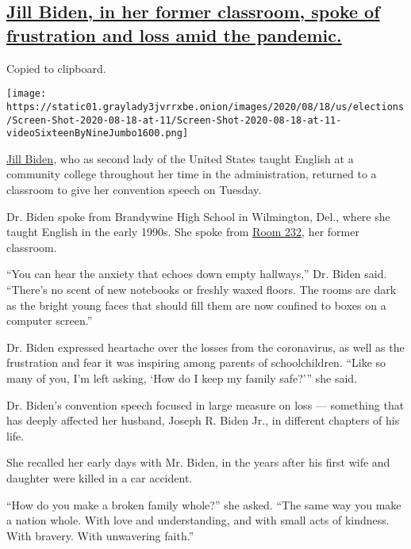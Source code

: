 \hypertarget{jill-biden-in-her-former-classroom-spoke-of-frustration-and-loss-amid-the-pandemic}{%
\subsection{\texorpdfstring{\protect\hyperlink{jill-biden-returns-to-her-old-classroom-to-deliver-convention-speech}{Jill
Biden, in her former classroom, spoke of frustration and loss amid the
pandemic.}}{Jill Biden, in her former classroom, spoke of frustration and loss amid the pandemic.}}\label{jill-biden-in-her-former-classroom-spoke-of-frustration-and-loss-amid-the-pandemic}}

Copied to clipboard.

\texttt{[image: https://static01.graylady3jvrrxbe.onion/images/2020/08/18/us/elections/Screen-Shot-2020-08-18-at-11/Screen-Shot-2020-08-18-at-11-videoSixteenByNineJumbo1600.png]}

\href{https://www.nytimes3xbfgragh.onion/2020/08/18/us/politics/jill-biden-dnc-speech.html}{Jill
Biden}, who as second lady of the United States taught English at a
community college throughout her time in the administration, returned to
a classroom to give her convention speech on Tuesday.

Dr. Biden spoke from Brandywine High School in Wilmington, Del., where
she taught English in the early 1990s. She spoke from
\href{https://twitter.com/DrBiden/status/1295694942141067269}{Room 232},
her former classroom.

``You can hear the anxiety that echoes down empty hallways,'' Dr. Biden
said. ``There's no scent of new notebooks or freshly waxed floors. The
rooms are dark as the bright young faces that should fill them are now
confined to boxes on a computer screen.''

Dr. Biden expressed heartache over the losses from the coronavirus, as
well as the frustration and fear it was inspiring among parents of
schoolchildren. ``Like so many of you, I'm left asking, `How do I keep
my family safe?''' she said.

Dr. Biden's convention speech focused in large measure on loss ---
something that has deeply affected her husband, Joseph R. Biden Jr., in
different chapters of his life.

She recalled her early days with Mr. Biden, in the years after his first
wife and daughter were killed in a car accident.

``How do you make a broken family whole?'' she asked. ``The same way you
make a nation whole. With love and understanding, and with small acts of
kindness. With bravery. With unwavering faith.''


